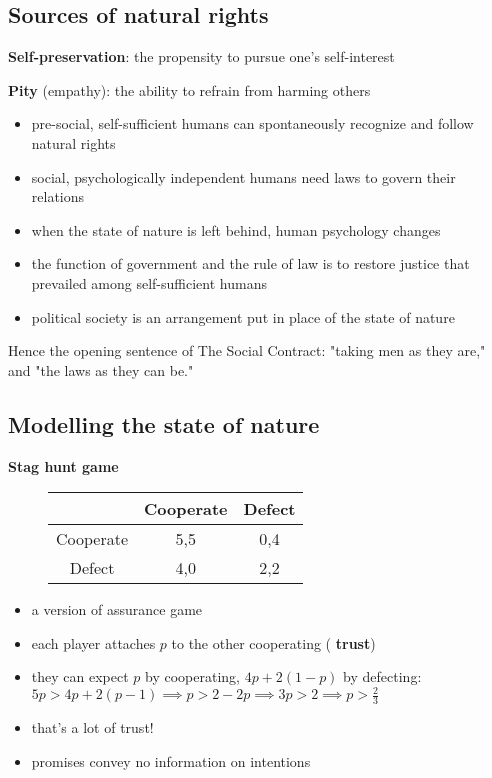 \subsection{Sources of natural rights}

\textbf{Self-preservation}: the propensity to pursue one's self-interest

\textbf{Pity} (empathy): the ability to refrain from harming others

\begin{itemize}
	\item pre-social, self-sufficient humans can spontaneously recognize
	and follow natural rights
	\item social, psychologically independent humans need laws to govern
	their relations
	\item when the state of nature is left behind, human psychology changes
	\item the function of government and the rule of law is to restore
	justice that prevailed among self-sufficient humans
	\item political society is an arrangement put in place of the state of
	nature
\end{itemize}

Hence the opening sentence of The Social Contract: "taking men as they are,"
and "the laws as they can be."

\subsection{Modelling the state of nature}

\textbf{Stag hunt game}

\begin{figure}[H]
    \centering
    \begin{tabular}{|c|c|c|}
    \hline
    & Cooperate & Defect \\
    \hline
    Cooperate & 5,5 & 0,4 \\
    \hline
    Defect & 4,0 & 2,2 \\
    \hline
\end{tabular}
\end{figure}

\begin{itemize}
	\item a version of assurance game
	\item each player attaches $p$ to the other cooperating (\textbf{
	trust})
	\item they can expect $p$ by cooperating, $4p+2(1-p)$ by defecting:
	$5p > 4p + 2(p-1) \implies p > 2 - 2p \implies 3p > 2
	\implies p > \frac{2}{3}$
	\item that's a lot of trust!
	\item promises convey no information on intentions
\end{itemize}

